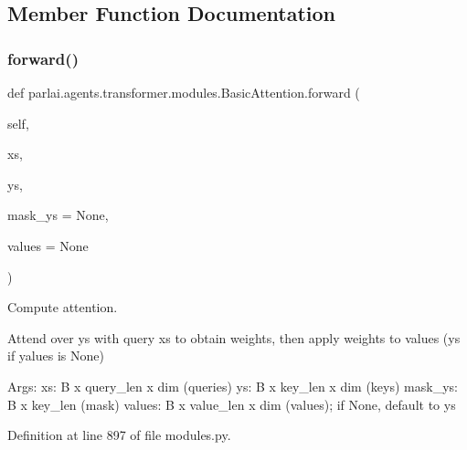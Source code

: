 \subsection{Member Function Documentation}
\mbox{\label{classparlai_1_1agents_1_1transformer_1_1modules_1_1BasicAttention_adb18b6c2564672c1820b3c72583dc0c0}} 
\subsubsection{\texorpdfstring{forward()}{forward()}}
{\footnotesize\ttfamily def parlai.\+agents.\+transformer.\+modules.\+Basic\+Attention.\+forward (\begin{DoxyParamCaption}\item[{}]{self,  }\item[{}]{xs,  }\item[{}]{ys,  }\item[{}]{mask\+\_\+ys = {\ttfamily None},  }\item[{}]{values = {\ttfamily None} }\end{DoxyParamCaption})}

\begin{DoxyVerb}Compute attention.

Attend over ys with query xs to obtain weights, then apply weights to
values (ys if yalues is None)

Args:
    xs: B x query_len x dim (queries)
    ys: B x key_len x dim (keys)
    mask_ys: B x key_len (mask)
    values: B x value_len x dim (values); if None, default to ys
\end{DoxyVerb}
 

Definition at line 897 of file modules.\+py.


